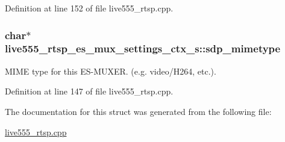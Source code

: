 Definition at line 152 of file live555\+\_\+rtsp.\+cpp.

\subsubsection[{\texorpdfstring{sdp\+\_\+mimetype}{sdp_mimetype}}]{\setlength{\rightskip}{0pt plus 5cm}char$\ast$ live555\+\_\+rtsp\+\_\+es\+\_\+mux\+\_\+settings\+\_\+ctx\+\_\+s\+::sdp\+\_\+mimetype}\hypertarget{structlive555__rtsp__es__mux__settings__ctx__s_add4d54b5d2dcca3713bf3bcaebd83539}{}\label{structlive555__rtsp__es__mux__settings__ctx__s_add4d54b5d2dcca3713bf3bcaebd83539}
M\+I\+ME type for this E\+S-\/\+M\+U\+X\+ER. (e.\+g. video/\+H264, etc.). 

Definition at line 147 of file live555\+\_\+rtsp.\+cpp.



The documentation for this struct was generated from the following file\+:\begin{DoxyCompactItemize}
\item 
\hyperlink{live555__rtsp_8cpp}{live555\+\_\+rtsp.\+cpp}\end{DoxyCompactItemize}
